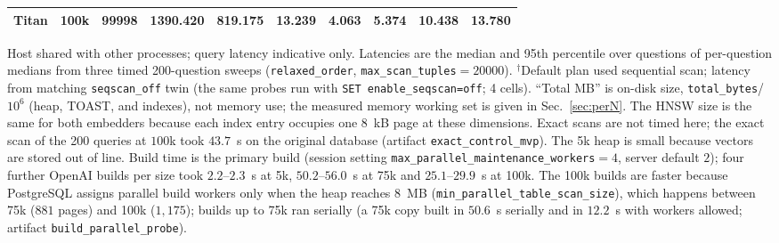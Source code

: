 \begin{table}[t]
{\begin{tabular}{@{}llrrrrrrrr@{}}
Titan & 100k & 99998 & 1390.420 & 819.175 & 13.239 & 4.063 & 5.374 & 10.438 & 13.780 \\
\bottomrule
\end{tabular}}
\par\smallskip\footnotesize{Host shared with other processes; query latency indicative only. Latencies are the median and 95th percentile over questions of per-question medians from three timed 200-question sweeps (\texttt{relaxed\_order}, \texttt{max\_scan\_tuples}${=}20000$). $^{\dagger}$Default plan used sequential scan; latency from matching \texttt{seqscan\_off} twin (the same probes run with \texttt{SET enable\_seqscan=off}; 4 cells). ``Total MB'' is on-disk size, \texttt{total\_bytes}/$10^6$ (heap, TOAST, and indexes), not memory use; the measured memory working set is given in Sec.~\ref{sec:perN}. The HNSW size is the same for both embedders because each index entry occupies one 8~kB page at these dimensions. Exact scans are not timed here; the exact scan of the 200 queries at $100$k took $43.7$~s on the original database (artifact \texttt{exact\_control\_mvp}). The 5k heap is small because vectors are stored out of line. Build time is the primary build (session setting \texttt{max\_parallel\_maintenance\_workers}$=4$, server default $2$); four further OpenAI builds per size took $2.2$--$2.3$~s at 5k, $50.2$--$56.0$~s at 75k and $25.1$--$29.9$~s at 100k. The 100k builds are faster because PostgreSQL assigns parallel build workers only when the heap reaches $8$~MB (\texttt{min\_parallel\_table\_scan\_size}), which happens between 75k ($881$ pages) and 100k ($1{,}175$); builds up to 75k ran serially (a 75k copy built in $50.6$~s serially and in $12.2$~s with workers allowed; artifact \texttt{build\_parallel\_probe}).}
\end{table}
